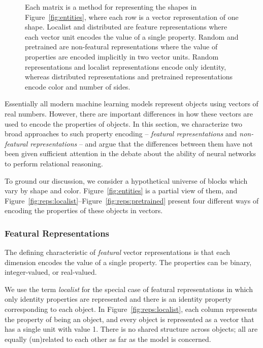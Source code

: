 \documentclass[9pt,twocolumn,twoside,lineno]{pnas-new}
\newcommand{\Figref}[1]{Figure~\ref{#1}}
\newcommand{\figref}[1]{Figure~\ref{#1}}
\newcommand{\tech}[1]{\emph{#1}}
\newcommand{\updatea}[1]{{\color{darkred}#1}}
\begin{document}
\begin{figure}[t!]
\caption{\updatea{Each matrix is a method for representing the shapes in \figref{fig:entities}, where each row is a vector representation of one shape. Localist and distributed are feature representations where each vector unit encodes the value of a single property. Random and pretrained are non-featural representations where the value of properties are encoded implicitly in two vector units. Random representations and localist representations encode only identity, whereas distributed representations and pretrained representations encode color and number of sides.}}
\label{fig:reps}
\end{figure}

Essentially all modern machine learning models represent objects using vectors of real numbers. However, there are important differences in how these vectors are used to encode the properties of objects. In this section, we characterize two broad approaches to such property encoding -- \tech{featural representations} and \tech{non-featural representations} -- and argue that the differences between them have not been given sufficient attention in the debate about the ability of neural networks to perform relational reasoning.

To ground our discussion, we consider a hypothetical universe of blocks which vary by shape and color. \Figref{fig:entities} is a partial view of them, and \figref{fig:reps:localist}--\figref{fig:reps:pretrained} present four different ways of encoding the properties of these objects in vectors.

\subsubsection*{Featural Representations}

The defining characteristic of \tech{featural} vector representations is that each dimension encodes the value of a single property. The properties can be binary, integer-valued, or real-valued.

We use the term \tech{localist} for the special case of featural representations in which only identity properties are represented and there is an identity property corresponding to each object. In \figref{fig:reps:localist}, each column represents the property of being an object, and every object is represented as a vector that has a single unit with value 1. There is no shared structure across objects; all are equally (un)related to each other as far as the model is concerned.
\end{document}

